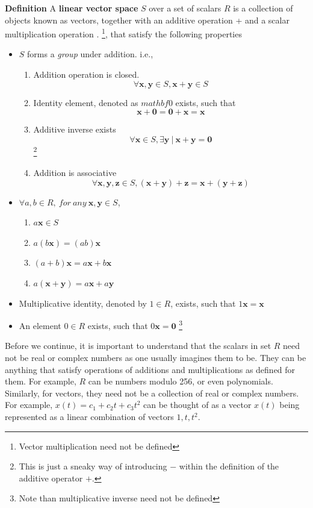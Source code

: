 	\begin{highlightedText}
	\textbf{Definition} A \textbf{linear vector space} \(S\) over a set of scalars \(R\) is a collection of objects known as vectors, together with an additive operation + and a scalar multiplication operation . \footnote{Vector multiplication need not be defined}, that satisfy the following properties
		\begin{itemize}
		\item \(S\) forms a \emph{group} under addition. i.e.,
			\begin{enumerate}
			\item Addition operation is closed.
				\[ \forall \mathbf{x}, \mathbf{y} \in S, \mathbf{x} + \mathbf{y} \in S \]
			\item Identity element, denoted as \(mathbf{0}\) exists, such that
				\[ \mathbf{x} + \mathbf{0} = \mathbf{0}+ \mathbf{x} = \mathbf{x} \]
			\item Additive inverse exists
				\[ \forall \mathbf{x} \in S, \exists \mathbf{y}\ |\ \mathbf{x} + \mathbf{y} = \mathbf{0} \] \footnote{This is just a sneaky way of introducing \(-\) within the definition of the additive operator \(+\).}
			\item Addition is associative
				\[ \forall \mathbf{x}, \mathbf{y}, \mathbf{z} \in S, (\mathbf{x} + \mathbf{y}) + \mathbf{z} = \mathbf{x} + (\mathbf{y} + \mathbf{z}) \]
			\end{enumerate}
		\item \( \forall a, b \in R,\ for\ any\ \mathbf{x}, \mathbf{y} \in S \),
			\begin{enumerate}
			\item \( a\mathbf{x} \in S \)
			\item \( a(b\mathbf{x}) = (ab)\mathbf{x} \)
			\item \( (a + b)\mathbf{x} = a\mathbf{x} + b\mathbf{x} \)
			\item \( a(\mathbf{x} + \mathbf{y}) = a\mathbf{x} + a\mathbf{y} \)
			\end{enumerate}
		\item Multiplicative identity, denoted by \(1 \in R\), exists, such that \(1\mathbf{x} = \mathbf{x}\) 
		\item An element \(0 \in R\) exists, such that \(0\mathbf{x} = \mathbf{0}\) \footnote{Note than multiplicative inverse need not be defined}
		\end{itemize}
	\end{highlightedText}

Before we continue, it is important to understand that the scalars in set \(R\) need not be real or complex numbers as one usually imagines them to be. They can be anything that satisfy operations of additions and multiplications as defined for them. For example, \(R\) can be numbers modulo 256, or even polynomials. Similarly, for vectors, they need not be a collection of real or complex numbers. For example, \(x(t) = c_1 + c_2t + c_3t^2\) can be thought of as a vector \(x(t)\) being represented as a linear combination of vectors \(1, t, t^2\).

